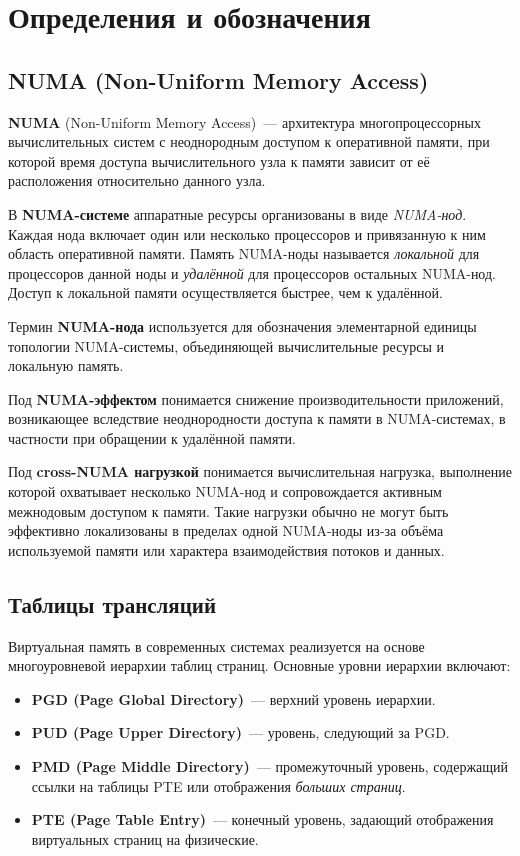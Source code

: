 \section{Определения и обозначения}
\label{sec:Abbreviations} 

\subsection{NUMA (Non-Uniform Memory Access)}

\textbf{NUMA} (Non-Uniform Memory Access)~--- архитектура многопроцессорных вычислительных систем с неоднородным доступом к оперативной памяти, при которой время доступа вычислительного узла к памяти зависит от её расположения относительно данного узла.

В \textbf{NUMA-системе} аппаратные ресурсы организованы в виде \textit{NUMA-нод}. Каждая нода включает один или несколько процессоров и привязанную к ним область оперативной памяти. Память NUMA-ноды называется \textit{локальной} для процессоров данной ноды и \textit{удалённой} для процессоров остальных NUMA-нод. Доступ к локальной памяти осуществляется быстрее, чем к удалённой.

Термин \textbf{NUMA-нода} используется для обозначения элементарной единицы топологии NUMA-системы, объединяющей вычислительные ресурсы и локальную память.

Под \textbf{NUMA-эффектом} понимается снижение производительности приложений, возникающее вследствие неоднородности доступа к памяти в NUMA-системах, в частности при обращении к удалённой памяти.

Под \textbf{cross-NUMA нагрузкой} понимается вычислительная нагрузка, выполнение которой охватывает несколько NUMA-нод и сопровождается активным межнодовым доступом к памяти. Такие нагрузки обычно не могут быть эффективно локализованы в пределах одной NUMA-ноды из-за объёма используемой памяти или характера взаимодействия потоков и данных.

\subsection{Таблицы трансляций}

Виртуальная память в современных системах реализуется на основе многоуровневой иерархии таблиц страниц. Основные уровни иерархии включают:
\begin{itemize}
    \item\textbf{PGD (Page Global Directory)}~--- верхний уровень иерархии.
    \item\textbf{PUD (Page Upper Directory)}~--- уровень, следующий за PGD.
    \item\textbf{PMD (Page Middle Directory)}~--- промежуточный уровень, содержащий ссылки на таблицы PTE или отображения \textit{больших страниц}.
    \item\textbf{PTE (Page Table Entry)}~--- конечный уровень, задающий отображения виртуальных страниц на физические.
\end{itemize}

